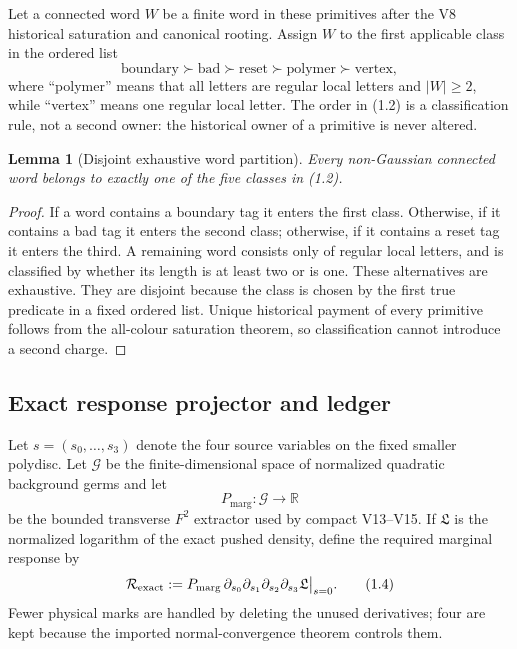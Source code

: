 \documentclass[11pt]{article}
\newtheorem{lemma}[theorem]{Lemma}
\theoremstyle{definition}
\theoremstyle{remark}
\newcommand{\cR}{\mathcal R}
\newcommand{\Pm}{P_{\mathrm{marg}}}
\begin{document}
Let a connected word $W$ be a finite word in these primitives after the V8
historical saturation and canonical rooting.  Assign $W$ to the first
applicable class in the ordered list
\[
 \mathrm{boundary}\succ\mathrm{bad}\succ\mathrm{reset}
 \succ\mathrm{polymer}\succ\mathrm{vertex},                  \tag{1.2}
\]
where ``polymer'' means that all letters are regular local letters and
$|W|\ge2$, while ``vertex'' means one regular local letter.  The order in
(1.2) is a classification rule, not a second owner: the historical owner of a
primitive is never altered.

\begin{lemma}[Disjoint exhaustive word partition]
\label{lem:word-partition}
Every non-Gaussian connected word belongs to exactly one of the five classes
in (1.2).
\end{lemma}

\begin{proof}
If a word contains a boundary tag it enters the first class.  Otherwise, if it
contains a bad tag it enters the second class; otherwise, if it contains a
reset tag it enters the third.  A remaining word consists only of regular
local letters, and is classified by whether its length is at least two or is
one.  These alternatives are exhaustive.  They are disjoint because the class
is chosen by the first true predicate in a fixed ordered list.  Unique
historical payment of every primitive follows from the all-colour saturation
theorem, so classification cannot introduce a second charge.
\end{proof}

\subsection{Exact response projector and ledger}

Let $s=(s_0,\ldots,s_3)$ denote the four source variables on the fixed smaller
polydisc.  Let $\mathcal G$ be the finite-dimensional space of normalized
quadratic background germs and let
\[
 \Pm:\mathcal G\longrightarrow\mathbb R                    \tag{1.3}
\]
be the bounded transverse $F^2$ extractor used by compact V13--V15.  If
$\mathfrak L$ is the normalized logarithm of the exact pushed density, define
the required marginal response by
\[
 \cR_{\rm exact}:=
 \Pm\,\partial_{s_0}\partial_{s_1}\partial_{s_2}
              \partial_{s_3}\mathfrak L\big|_{s=0}.          \tag{1.4}
\]
Fewer physical marks are handled by deleting the unused derivatives; four are
kept because the imported normal-convergence theorem controls them.
\end{document}
